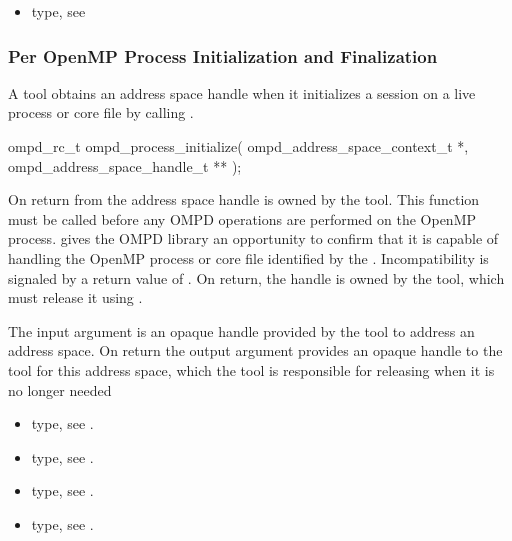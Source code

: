 \crossreferences
\begin{itemize}
	\item {} type, see 
\end{itemize}

\subsubsection{Per OpenMP Process Initialization and Finalization}

\label{subsubsubsec:ompd_process_initialize}
\summary
A tool obtains an address space handle when it initializes
a session on a live process or core file by calling .

\format

\begin{cspecific}
\begin{ompSyntax}
ompd_rc_t ompd_process_initialize(
  ompd_address_space_context_t *,
  ompd_address_space_handle_t **
);
\end{ompSyntax}
\end{cspecific}


\descr
On return from  the address
space handle is owned by the tool. This function must be called before any OMPD operations
are performed on the OpenMP process.  gives the OMPD library an
opportunity to confirm that it is capable of handling the OpenMP process or core file identified by
the . Incompatibility is signaled by a return value of .
On return, the handle is owned by the tool, which must release it using
.

\argdesc
The input argument  is an opaque handle provided by the tool
to address an address space.
On return the output argument  provides an opaque handle to the
tool for this address space, which the tool is responsible for
releasing when it is no longer needed

\crossreferences
\begin{itemize}
  \item {} type, see .
	\item {} type, see .
	\item {} type, see .
	\item {} type, see .
\end{itemize}


